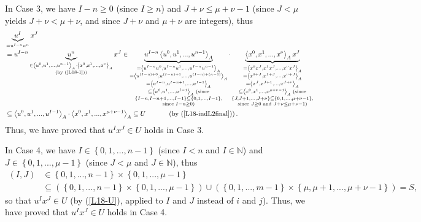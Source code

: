 \documentclass[12pt,final,notitlepage,onecolumn]{article}%
\begin{document}
In Case 3, we have $I-n\geq0$ (since $I\geq n$) and $J+\nu\leq\mu+\nu-1$
(since $J<\mu$ yields $J+\nu<\mu+\nu$, and since $J+\nu$ and $\mu+\nu$ are
integers), thus%
\begin{align*}
&  \underbrace{u^{I}}_{=u^{I-n}u^{n}}x^{J}\\
&  =u^{I-n}\underbrace{u^{n}}_{\substack{\in\left\langle u^{0},u^{1}%
,...,u^{n-1}\right\rangle _{A}\cdot\left\langle x^{0},x^{1},...,x^{\nu
}\right\rangle _{A}\\\left(  \text{by (\ref{L18-1})}\right)  }}x^{J}%
\in\underbrace{u^{I-n}\left\langle u^{0},u^{1},...,u^{n-1}\right\rangle _{A}%
}_{\substack{=\left\langle u^{I-n}u^{0},u^{I-n}u^{1},...,u^{I-n}%
u^{n-1}\right\rangle _{A}\\=\left\langle u^{\left(  I-n\right)  +0},u^{\left(
I-n\right)  +1},...,u^{\left(  I-n\right)  +\left(  n-1\right)  }\right\rangle
_{A}\\=\left\langle u^{I-n},u^{I-n+1},...,u^{I-1}\right\rangle _{A}%
\\\subseteq\left\langle u^{0},u^{1},...,u^{I-1}\right\rangle _{A}\text{
(since}\\\left\{  I-n,I-n+1,...,I-1\right\}  \subseteq\left\{
0,1,...,I-1\right\}  ,\\\text{since }I-n\geq0\text{)}}}\cdot
\underbrace{\left\langle x^{0},x^{1},...,x^{\nu}\right\rangle _{A}x^{J}%
}_{\substack{=\left\langle x^{0}x^{J},x^{1}x^{J},...,x^{\nu}x^{J}\right\rangle
_{A}\\=\left\langle x^{0+J},x^{1+J},...,x^{\nu+J}\right\rangle _{A}%
\\=\left\langle x^{J},x^{J+1},...,x^{J+\nu}\right\rangle _{A}\\\subseteq
\left\langle x^{0},x^{1},...,x^{\mu+\nu-1}\right\rangle _{A}\text{
(since}\\\left\{  J,J+1,...,J+\nu\right\}  \subseteq\left\{  0,1,...,\mu
+\nu-1\right\}  ,\\\text{since }J\geq0\text{ and }J+\nu\leq\mu+\nu-1\text{)}%
}}\\
&  \subseteq\left\langle u^{0},u^{1},...,u^{I-1}\right\rangle _{A}%
\cdot\left\langle x^{0},x^{1},...,x^{\mu+\nu-1}\right\rangle _{A}\subseteq
U\ \ \ \ \ \ \ \ \ \ \left(  \text{by (\ref{L18-indL2final})}\right)  .
\end{align*}
Thus, we have proved that $u^{I}x^{J}\in U$ holds in Case 3.

In Case 4, we have $I\in\left\{  0,1,...,n-1\right\}  $ (since $I<n$ and
$I\in\mathbb{N}$) and $J\in\left\{  0,1,...,\mu-1\right\}  $ (since $J<\mu$
and $J\in\mathbb{N}$), thus%
\begin{align*}
\left(  I,J\right)   &  \in\left\{  0,1,...,n-1\right\}  \times\left\{
0,1,...,\mu-1\right\} \\
&  \subseteq\left(  \left\{  0,1,...,n-1\right\}  \times\left\{
0,1,...,\mu-1\right\}  \right)  \cup\left(  \left\{  0,1,...,m-1\right\}
\times\left\{  \mu,\mu+1,...,\mu+\nu-1\right\}  \right)  =S,
\end{align*}
so that $u^{I}x^{J}\in U$ (by (\ref{L18-U}), applied to $I$ and $J$ instead of
$i$ and $j$). Thus, we have proved that $u^{I}x^{J}\in U$ holds in Case 4.
\end{document}
